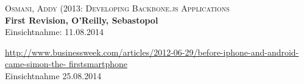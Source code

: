 \begin{thebibliography}{\hspace{25mm}}


	\textsc{Osmani, Addy (2013: Developing Backbone.js Applications}\\
	\textbf{First Revision, O'Reilly, Sebastopol}\\
	Einsichtnahme: 11.08.2014

	
	\url{http://www.businessweek.com/articles/2012-06-29/before-iphone-and-android-came-simon-the-		firstsmartphone}\\
	Einsichtnahme	25.08.2014
	
	
\end{thebibliography}
